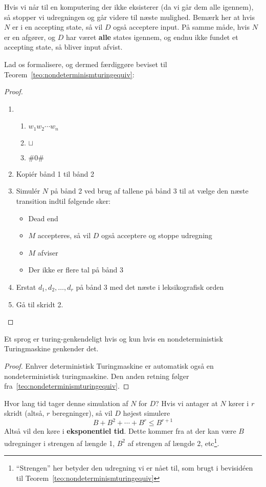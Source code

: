 Hvis vi når til en komputering der ikke eksisterer (da vi går dem alle igennem), så stopper vi udregningen og går videre til næste mulighed.
Bemærk her at hvis $N$ er i en accepting state, så vil $D$ også acceptere input. På samme måde, hvis $N$ er en afgører, og $D$ har været \textbf{alle} states igennem, og endnu ikke fundet et accepting state, så bliver input afvist.

Lad os formalisere, og dermed færdiggøre beviset til Teorem~\ref{teo:nondeterminismturingequiv}:

\begin{proof}
\begin{enumerate}
  \item \begin{enumerate}
		  \item $w_{1}w_{2}\cdots w_{n}$
		  \item $\sqcup$
		  \item $\#0\#$
		\end{enumerate}
  \item Kopiér bånd 1 til bånd 2
  \item Simulér $N$ på bånd 2 ved brug af tallene på bånd 3 til at vælge den næste transition indtil følgende sker:
		\begin{itemize}
		  \item Dead end
		  \item $M$ accepteres, så vil $D$ også acceptere og stoppe udregning
		  \item $M$ afviser
		  \item Der ikke er flere tal på bånd 3
		\end{itemize}
  \item Erstat $d_{1},d_{2},\ldots, d_{r}$ på bånd 3 med det næste i leksikografisk orden
  \item Gå til skridt 2.
\end{enumerate}
\end{proof}


\begin{corollary}
	Et sprog er turing-genkendeligt hvis og kun hvis en nondeterministisk Turingmaskine genkender det.
\end{corollary}

\begin{proof}
	Enhver deterministisk Turingmaskine er automatisk også en nondeterministisk turingmaskine. Den anden retning følger fra~\ref{teo:nondeterminismturingequiv}.
\end{proof}

Hvor lang tid tager denne simulation af $N$ for $D$? Hvis vi antager at $N$ kører i $r$ skridt (altså, $r$ beregninger), så vil $D$ højest simulere
\begin{equation}
B+B^{2}+\cdots +B^{r} \leq B^{r+1}
\end{equation}
Altså vil den køre i \textbf{eksponentiel tid}. Dette kommer fra at der kan være $B$ udregninger i strengen af længde 1, $B^{2}$ af strengen af længde 2, etc\footnote{``Strengen'' her betyder den udregning vi er nået til, som brugt i bevisidéen til Teorem~\ref{teo:nondeterminismturingequiv}}.

